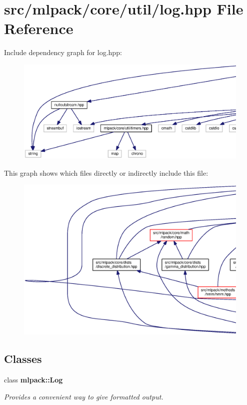 \section{src/mlpack/core/util/log.hpp File Reference}
\label{log_8hpp}
Include dependency graph for log.\+hpp\+:
\nopagebreak
\begin{figure}[H]
\begin{center}
\leavevmode
\includegraphics[width=350pt]{log_8hpp__incl}
\end{center}
\end{figure}
This graph shows which files directly or indirectly include this file\+:
\nopagebreak
\begin{figure}[H]
\begin{center}
\leavevmode
\includegraphics[width=350pt]{log_8hpp__dep__incl}
\end{center}
\end{figure}
\subsection*{Classes}
\begin{DoxyCompactItemize}
\item 
class {\bf mlpack\+::\+Log}
\begin{DoxyCompactList}\small\item\em Provides a convenient way to give formatted output. \end{DoxyCompactList}\end{DoxyCompactItemize}
